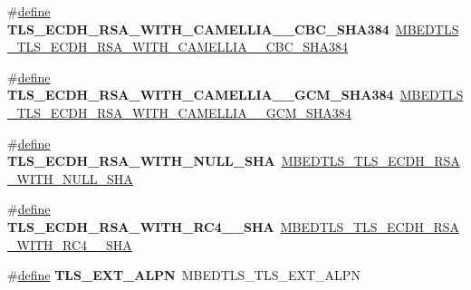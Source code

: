 \begin{DoxyCompactItemize}
\item 
\mbox{\label{compat-1_83_8h_a95cd929afae5e8ff7ecbea3cde22317f}} 
\#\hyperlink{structdefine}{define} {\bfseries T\+L\+S\+\_\+\+E\+C\+D\+H\+\_\+\+R\+S\+A\+\_\+\+W\+I\+T\+H\+\_\+\+C\+A\+M\+E\+L\+L\+I\+A\+\_\+\_\+\+C\+B\+C\+\_\+\+S\+H\+A384}~\hyperlink{ssl__ciphersuites_8h_a231649301a478e13c49853ba5cfaaac3}{M\+B\+E\+D\+T\+L\+S\+\_\+\+T\+L\+S\+\_\+\+E\+C\+D\+H\+\_\+\+R\+S\+A\+\_\+\+W\+I\+T\+H\+\_\+\+C\+A\+M\+E\+L\+L\+I\+A\+\_\+\_\+\+C\+B\+C\+\_\+\+S\+H\+A384}
\item 
\mbox{\label{compat-1_83_8h_abdff6e19b8b020e4fe53dd3bd5e39bd3}} 
\#\hyperlink{structdefine}{define} {\bfseries T\+L\+S\+\_\+\+E\+C\+D\+H\+\_\+\+R\+S\+A\+\_\+\+W\+I\+T\+H\+\_\+\+C\+A\+M\+E\+L\+L\+I\+A\+\_\+\_\+\+G\+C\+M\+\_\+\+S\+H\+A384}~\hyperlink{ssl__ciphersuites_8h_a279c1bcea69d0ebbc72700755a9a9270}{M\+B\+E\+D\+T\+L\+S\+\_\+\+T\+L\+S\+\_\+\+E\+C\+D\+H\+\_\+\+R\+S\+A\+\_\+\+W\+I\+T\+H\+\_\+\+C\+A\+M\+E\+L\+L\+I\+A\+\_\+\_\+\+G\+C\+M\+\_\+\+S\+H\+A384}
\item 
\mbox{\label{compat-1_83_8h_a3c0570b63d87d68aaf561e2c7e3169fb}} 
\#\hyperlink{structdefine}{define} {\bfseries T\+L\+S\+\_\+\+E\+C\+D\+H\+\_\+\+R\+S\+A\+\_\+\+W\+I\+T\+H\+\_\+\+N\+U\+L\+L\+\_\+\+S\+HA}~\hyperlink{ssl__ciphersuites_8h_a19df69ed79216faf18e8d728c6222158}{M\+B\+E\+D\+T\+L\+S\+\_\+\+T\+L\+S\+\_\+\+E\+C\+D\+H\+\_\+\+R\+S\+A\+\_\+\+W\+I\+T\+H\+\_\+\+N\+U\+L\+L\+\_\+\+S\+HA}
\item 
\mbox{\label{compat-1_83_8h_abb4976edbaa478fb4853781874f8e60b}} 
\#\hyperlink{structdefine}{define} {\bfseries T\+L\+S\+\_\+\+E\+C\+D\+H\+\_\+\+R\+S\+A\+\_\+\+W\+I\+T\+H\+\_\+\+R\+C4\+\_\+\_\+\+S\+HA}~\hyperlink{ssl__ciphersuites_8h_a056993a63012bbc052dec03de3370369}{M\+B\+E\+D\+T\+L\+S\+\_\+\+T\+L\+S\+\_\+\+E\+C\+D\+H\+\_\+\+R\+S\+A\+\_\+\+W\+I\+T\+H\+\_\+\+R\+C4\+\_\+\_\+\+S\+HA}
\item 
\mbox{\label{compat-1_83_8h_a4b91900b335587d00420ed5a48e88e7d}} 
\#\hyperlink{structdefine}{define} {\bfseries T\+L\+S\+\_\+\+E\+X\+T\+\_\+\+A\+L\+PN}~M\+B\+E\+D\+T\+L\+S\+\_\+\+T\+L\+S\+\_\+\+E\+X\+T\+\_\+\+A\+L\+PN
\item 
\mbox{\label{compat-1_83_8h_ae136afe82bd9031a4c1c604de0cb0118}} 

\end{DoxyCompactItemize}
